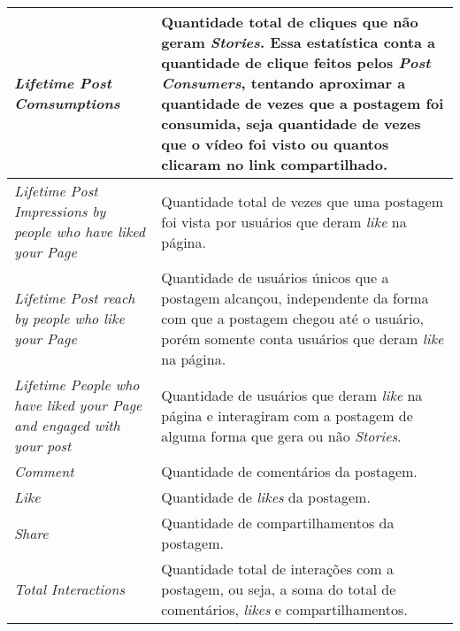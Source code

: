 \begin{quadro}[!htb]
\begin{longtable}{|p{7cm}|p{7cm}|}
		\textit{Lifetime Post Comsumptions} & Quantidade total de cliques que não geram \textit{Stories}. Essa estatística conta a quantidade de clique feitos pelos \textit{Post Consumers}, tentando aproximar a quantidade de vezes que a postagem foi consumida, seja quantidade de vezes que o vídeo foi visto ou quantos clicaram no link compartilhado. \\ \hline
		\textit{Lifetime Post Impressions by people who have liked your Page} & Quantidade total de vezes que uma postagem foi vista por usuários que deram \textit{like} na página. \\ \hline
		\textit{Lifetime Post reach by people who like your Page} & Quantidade de usuários únicos que a postagem alcançou, independente da forma com que a postagem chegou até o usuário, porém somente conta usuários que deram \textit{like} na página. \\ \hline
		\textit{Lifetime People who have liked your Page and engaged with your post} & Quantidade de usuários que deram \textit{like} na página e interagiram com a postagem de alguma forma que gera ou não \textit{Stories}. \\ \hline
		\textit{Comment} & Quantidade de comentários da postagem. \\ \hline
		\textit{Like} & Quantidade de \textit{likes} da postagem. \\ \hline
		\textit{Share} & Quantidade de compartilhamentos da postagem. \\ \hline
		\textit{Total Interactions} & Quantidade total de interações com a postagem, ou seja, a soma do total de comentários, \textit{likes} e compartilhamentos. \\ \hline
    \end{longtable}
\end{quadro}